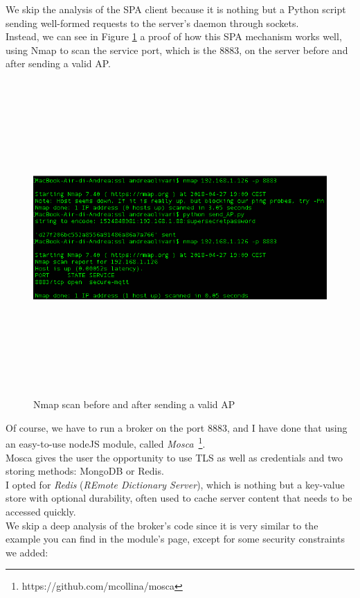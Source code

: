 \documentclass[12pt]{report}
\begin{document}
{{We skip the analysis of the SPA client because it is nothing but a Python script sending well-formed requests to the server's daemon through sockets.\\

Instead, we can see in Figure \ref{fig:nmapproof} a proof of how this SPA mechanism works well, using Nmap to scan the service port, which is the 8883, on the server before and after sending a valid AP.

\begin{figure}[H]
\includegraphics[width=13cm,height=12cm,keepaspectratio]{nmap_proof}
\centering
\caption{Nmap scan before and after sending a valid AP}
\label{fig:nmapproof}
\end{figure}

Of course, we have to run a broker on the port 8883, and I have done that using an easy-to-use nodeJS module, called \emph{Mosca}~\footnote{https://github.com/mcollina/mosca}.\\ 

Mosca gives the user the opportunity to use TLS as well as credentials and two storing methods: MongoDB or Redis.\\
I opted for \emph{Redis} (\emph{REmote Dictionary Server}), which is  nothing but a key-value store with optional durability, often used to cache server content that needs to be accessed quickly.\\
We skip a deep analysis of the broker's code since it is very similar to the example you can find in the module's page, except for some security constraints we added:

}}
\end{document}
